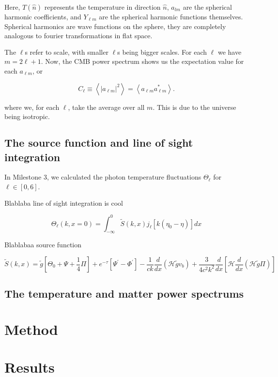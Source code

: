 \documentclass[12pt]{article}
\begin{document}
Here, $T(\hat{n})$ represents the temperature in direction $\hat{n}$, $a_{lm}$ are the spherical harmonic coefficients, and $Y_{\ell m}$ are the spherical harmonic functions themselves. Spherical harmonics are wave functions on the sphere, they are completely analogous to fourier transformations in flat space. 

The $\ell$s refer to scale, with smaller $\ell$s being bigger scales. For each $\ell$ we have $m=2\ell + 1$. Now, the CMB power spectrum shows us the expectation value for each $a_{\ell m}$, or

\begin{equation}
    C_{\ell} \equiv\left\langle\left|a_{\ell m}\right|^{2}\right\rangle=\left\langle a_{\ell m} a_{\ell m}^{*}\right\rangle.
\end{equation}

where we, for each $\ell$, take the average over all $m$. This is due to the universe being isotropic. 

\subsection{The source function and line of sight integration}
In Milestone 3, we calculated the photon temperature fluctuations $\Theta_\ell$ for $\ell \in [0,6]$. 

Blablaba line of sight integration is cool

\begin{equation}
    \Theta_{\ell}(k, x=0)=\int_{-\infty}^{0} \tilde{S}(k, x) j_{\ell}\left[k\left(\eta_{0}-\eta\right)\right] d x
\end{equation}

Blablabaa source function 

\begin{equation}
    \tilde{S}(k, x)=\tilde{g}\left[\Theta_{0}+\Psi+\frac{1}{4} \Pi\right]+e^{-\tau}\left[\Psi^{\prime}-\Phi^{\prime}\right]-\frac{1}{c k} \frac{d}{d x}\left(\mathcal{H} \tilde{g} v_{b}\right)+\frac{3}{4 c^{2} k^{2}} \frac{d}{d x}\left[\mathcal{H} \frac{d}{d x}(\mathcal{H} \tilde{g} \Pi)\right]
\end{equation}

\subsection{The temperature and matter power spectrums}


\section{Method}

\section{Results}

{}

\end{document}
